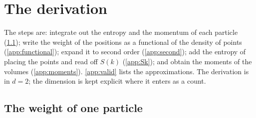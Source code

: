 \documentclass[11pt,aps,preprint,nofootinbib,superscriptaddress,tightenlines]{revtex4-2}
\begin{document}
\appendix

\section{The derivation}
\label{app:expand}

The steps are: integrate out the entropy and the momentum of each particle (\ref{app:single}); write the weight of the positions
as a functional of the density of points (\ref{app:functional}); expand it to second order (\ref{app:second}); add the entropy of placing
the points and read off $S(k)$ (\ref{app:Sk}); and obtain the moments of the volumes (\ref{app:moments}).  \ref{app:valid} lists the
approximations.  The derivation is in $d=2$; the dimension is kept explicit where it enters as a count.

\subsection{The weight of one particle}
\label{app:single}
\end{document}
